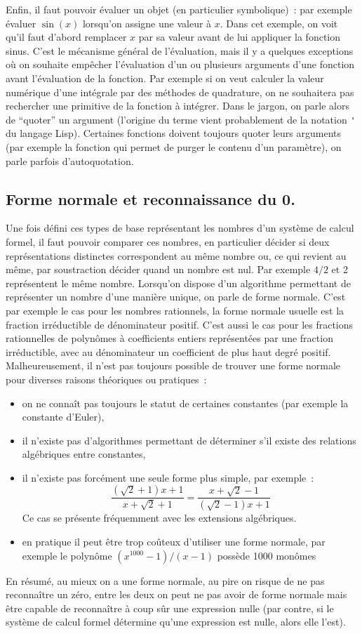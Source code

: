 \documentclass[a4paper,11pt]{article}
\begin{document}
\begin{giacjshere}
Enfin, il faut pouvoir \'evaluer un objet (en particulier symbolique)~:
par exemple évaluer $\sin(x)$ lorsqu'on assigne une valeur \`a $x$. 
Dans cet exemple, on voit qu'il faut d'abord remplacer $x$ par
sa valeur avant de lui appliquer la fonction sinus. C'est le mécanisme
général de l'évaluation, mais il y a quelques exceptions où
on souhaite empêcher l'évaluation d'un ou plusieurs arguments
d'une fonction avant l'évaluation de la fonction. Par exemple si on 
veut calculer la valeur numérique d'une intégrale par des méthodes
de quadrature, on ne souhaitera pas rechercher une primitive de la 
fonction à intégrer. Dans le jargon, on parle alors de ``quoter'' un argument 
(l'origine du terme vient probablement de la notation \verb|'| du langage 
Lisp). Certaines fonctions doivent toujours quoter leurs arguments
(par exemple la fonction qui permet de purger le contenu d'un paramètre),
on parle parfois d'autoquotation.


\subsection{Forme normale et reconnaissance du 0.}
Une fois défini ces types de base représentant les nombres d'un système de 
calcul formel, il faut pouvoir comparer ces 
nombres, en particulier décider si deux représentations distinctes 
correspondent au m\^eme nombre ou, ce qui revient au 
m\^eme, par soustraction décider quand un nombre est nul. 
Par exemple $4/2$ et 2 représentent le m\^eme nombre. 
Lorsqu'on dispose d'un algorithme permettant de représenter un nombre 
d'une manière unique, on parle de forme normale. 
C'est par exemple le cas pour les nombres rationnels, la forme normale 
usuelle est la fraction irréductible de 
dénominateur positif. C'est aussi le cas pour les fractions rationnelles 
de polynômes à coefficients entiers représentées par une fraction 
irréductible, avec au dénominateur un coefficient de plus haut degré
positif.
Malheureusement, il n'est pas toujours possible de trouver une forme normale
pour diverses raisons théoriques ou pratiques~: 
\begin{itemize}
\item on ne connaît pas toujours le statut de certaines constantes
(par exemple la constante d'Euler),
\item il n'existe pas d'algorithmes permettant de déterminer
s'il existe des relations algébriques entre constantes,
\item il n'existe pas forcément une seule forme plus simple, par exemple~:
\[ \frac{(\sqrt{2}+1)x+1}{x+\sqrt{2}+1}=\frac{x+\sqrt{2}-1}{(\sqrt{2}-1)x+1} \]
Ce cas se présente fréquemment avec les extensions algébriques.
\item en pratique il peut être trop coûteux d'utiliser une forme
normale, par exemple le polynôme $(x^{1000}-1)/(x-1)$ possède 1000 monômes
\end{itemize}
En résumé, au mieux on a une forme normale, au pire on risque de ne pas 
reconnaître un zéro, entre les deux on peut ne
pas avoir de forme normale mais être capable de reconnaître à coup sûr 
une expression nulle (par contre, si le système 
de calcul formel détermine qu'une expression est nulle, alors elle l'est).


\end{giacjshere}
\end{document}
